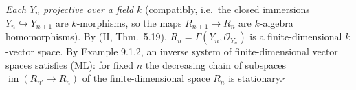 \documentclass[11pt]{article}
\begin{document}
\emph{Each $Y_n$ projective over a field $k$} (compatibly, i.e.\ the closed immersions $Y_n\hookrightarrow Y_{n+1}$ are $k$-morphisms, so the maps $R_{n+1}\to R_n$ are $k$-algebra homomorphisms). By (II, Thm.~5.19), $R_n=\Gamma(Y_n,\mathcal O_{Y_n})$ is a finite-dimensional $k$-vector space. By Example 9.1.2, an inverse system of finite-dimensional vector spaces satisfies (ML): for fixed $n$ the decreasing chain of subspaces $\operatorname{im}(R_{n'}\to R_n)$ of the finite-dimensional space $R_n$ is stationary.\hfill$\square$
\end{document}
